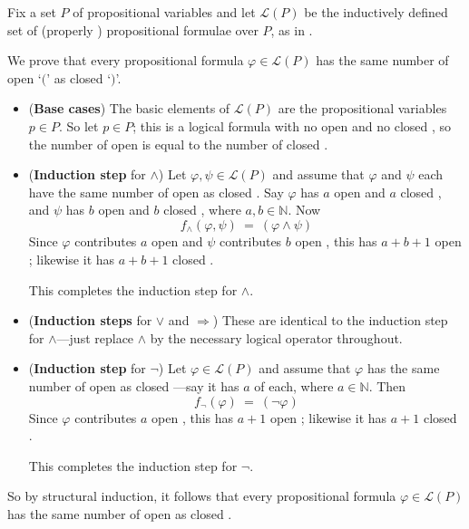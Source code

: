 \begin{example}
Fix a set $P$ of propositional variables and let $\mathcal{L}(P)$ be the inductively defined set of (properly ) propositional formulae over $P$, as in .

We prove that every propositional formula $\varphi \in \mathcal{L}(P)$ has the same number of open  `$($' as closed  `$)$'.

\begin{itemize}
\item (\textbf{Base cases}) The basic elements of $\mathcal{L}(P)$ are the propositional variables $p \in P$. So let $p \in P$; this is a logical formula with no open  and no closed , so the number of open  is equal to the number of closed .

\item (\textbf{Induction step} for $\wedge$) Let $\varphi, \psi \in \mathcal{L}(P)$ and assume that $\varphi$ and $\psi$ each have the same number of open  as closed . Say $\varphi$ has $a$ open  and $a$ closed , and $\psi$ has $b$ open  and $b$ closed , where $a,b \in \mathbb{N}$. Now
\[ f_{\wedge}(\varphi, \psi) ~=~ (\varphi \wedge \psi) \]
Since $\varphi$ contributes $a$ open  and $\psi$ contributes $b$ open , this has $a+b+1$ open ; likewise it has $a+b+1$ closed .

This completes the induction step for $\wedge$.

\item (\textbf{Induction steps} for $\vee$ and $\Rightarrow$) These are identical to the induction step for $\wedge$---just replace $\wedge$ by the necessary logical operator throughout.

\item (\textbf{Induction step} for $\neg$) Let $\varphi \in \mathcal{L}(P)$ and assume that $\varphi$ has the same number of open  as closed ---say it has $a$ of each, where $a \in \mathbb{N}$. Then
\[ f_{\neg}(\varphi) ~=~ (\neg \varphi) \]
Since $\varphi$ contributes $a$ open , this has $a+1$ open ; likewise it has $a+1$ closed .

This completes the induction step for $\neg$.
\end{itemize}

So by structural induction, it follows that every propositional formula $\varphi \in \mathcal{L}(P)$ has the same number of open  as closed .
\end{example}


